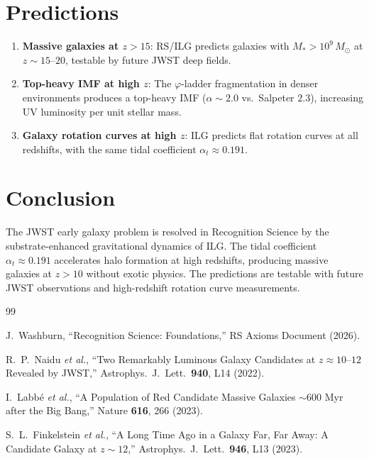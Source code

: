 \documentclass[12pt,a4paper]{article}
\theoremstyle{definition}
\theoremstyle{remark}
\begin{document}
\section{Predictions}
\label{sec:predictions}

\begin{enumerate}
  \item \textbf{Massive galaxies at $z > 15$}: RS/ILG predicts
  galaxies with $M_* > 10^9\,M_\odot$ at $z \sim 15$--$20$,
  testable by future JWST deep fields.

  \item \textbf{Top-heavy IMF at high $z$}: The $\varphi$-ladder
  fragmentation in denser environments produces a top-heavy IMF
  ($\alpha \sim 2.0$ vs.\ Salpeter $2.3$), increasing
  UV luminosity per unit stellar mass.

  \item \textbf{Galaxy rotation curves at high $z$}: ILG predicts
  flat rotation curves at all redshifts, with the same tidal
  coefficient $\alpha_t \approx 0.191$.
\end{enumerate}

\section{Conclusion}
\label{sec:conclusion}

The JWST early galaxy problem is resolved in Recognition Science
by the substrate-enhanced gravitational dynamics of ILG.  The tidal
coefficient $\alpha_t \approx 0.191$ accelerates halo formation at
high redshifts, producing massive galaxies at $z > 10$ without
exotic physics.  The predictions are testable with future JWST
observations and high-redshift rotation curve measurements.

\begin{thebibliography}{99}

J.~Washburn, ``Recognition Science: Foundations,''
RS Axioms Document (2026).

R.~P.~Naidu \textit{et al.}, ``Two Remarkably Luminous Galaxy
Candidates at $z \approx 10$--$12$ Revealed by JWST,'' Astrophys.\
J.\ Lett.\ \textbf{940}, L14 (2022).

I.~Labb\'e \textit{et al.}, ``A Population of Red Candidate Massive
Galaxies $\sim 600$ Myr after the Big Bang,'' Nature \textbf{616},
266 (2023).

S.~L.~Finkelstein \textit{et al.}, ``A Long Time Ago in a Galaxy
Far, Far Away: A Candidate Galaxy at $z \sim 12$,'' Astrophys.\ J.\
Lett.\ \textbf{946}, L13 (2023).

\end{thebibliography}
\end{document}
